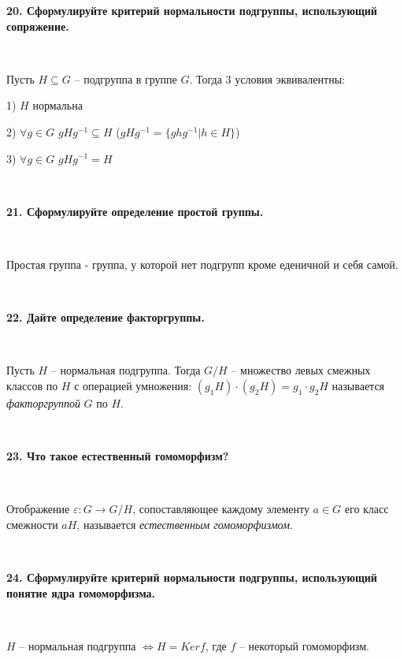 \documentclass{article}
\begin{document}
    \textbf{20. Сформулируйте критерий нормальности подгруппы, использующий сопряжение.}

    {
        $\;$
        \setlength{\parindent}{0.4cm}
        \hangindent=0.4cm

    Пусть $H\subseteq G$ -- подгруппа в группе $G$. Тогда 3 условия эквивалентны:

    1) $H$ нормальна

    2) $\forall g\in G$ $gHg^{-1}\subseteq H$ ($gHg^{-1}=\{ghg^{-1}|h\in H \}$)

        3) $\forall g\in G$ $gHg^{-1}=H$

        $\;$
        \setlength{\parindent}{0cm}
        \hangindent=0cm
    }

    \textbf{21. Сформулируйте определение простой группы.}

    {
        $\;$
        \setlength{\parindent}{0.4cm}
        \hangindent=0.4cm

    Простая группа - группа, у которой нет подгрупп кроме еденичной и себя самой.

        $\;$
        \setlength{\parindent}{0cm}
        \hangindent=0cm
    }

    \textbf{22. Дайте определение факторгруппы.}

    {
        $\;$
        \setlength{\parindent}{0.4cm}
        \hangindent=0.4cm

    Пусть $H$ -- нормальная подгруппа. Тогда $G/ H$ -- множество левых смежных классов по $H$ с операцией умножения: $(g_1H)\cdot(g_2H)=g_1\cdot g_2H$ называется \textit{факторгруппой} $G$ по $H$.

        $\;$
        \setlength{\parindent}{0cm}
        \hangindent=0cm
    }

    \textbf{23. Что такое естественный гомоморфизм?}

    {
        $\;$
        \setlength{\parindent}{0.4cm}
        \hangindent=0.4cm

    Отображение $\varepsilon:G\rightarrow G/H$, сопоставляющее каждому элементу $a\in G$ его класс смежности $aH$, называется \textit{естественным гомоморфизмом}.

        $\;$
        \setlength{\parindent}{0cm}
        \hangindent=0cm
    }

    \textbf{24. Сформулируйте критерий нормальности подгруппы, использующий понятие ядра гомоморфизма.}

    {
        $\;$
        \setlength{\parindent}{0.4cm}
        \hangindent=0.4cm

        $H$ -- нормальная подгруппа $\Leftrightarrow H=Ker f$, где $f$ -- некоторый гомоморфизм.

        $\;$
        \setlength{\parindent}{0cm}
        \hangindent=0cm
    }
\end{document}
